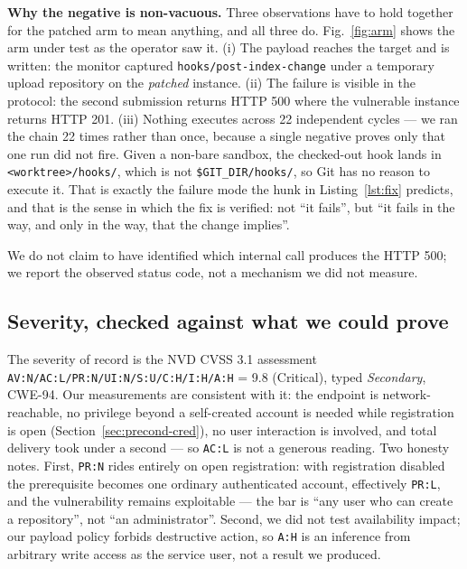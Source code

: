 \documentclass[journal]{IEEEtran}
\begin{document}
\textbf{Why the negative is non-vacuous.} Three observations have to hold
together for the patched arm to mean anything, and all three do. Fig.~\ref{fig:arm}
shows the arm under test as the operator saw it. (i) The payload
reaches the target and is written: the monitor captured
\texttt{hooks/post-index-change} under a temporary upload repository on the
\emph{patched} instance. (ii) The failure is visible in the protocol: the second
submission returns HTTP 500 where the vulnerable instance returns HTTP 201.
(iii) Nothing executes across 22 independent cycles --- we ran the chain 22 times
rather than once, because a single negative proves only that one run did not
fire. Given a non-bare sandbox, the checked-out hook lands in
\texttt{<worktree>/hooks/}, which is not \texttt{\$GIT\_DIR/hooks/}, so Git has no
reason to execute it. That is exactly the failure mode the hunk in
Listing~\ref{lst:fix} predicts, and that is the sense in which the fix is
verified: not ``it fails'', but ``it fails in the way, and only in the way, that
the change implies''.

We do not claim to have identified which internal call produces the HTTP 500; we
report the observed status code, not a mechanism we did not measure.

\subsection{Severity, checked against what we could prove}
\label{sec:cvss}

The severity of record is the NVD CVSS 3.1 assessment
\texttt{AV:N/AC:L/PR:N/UI:N/S:U/C:H/I:H/A:H} = 9.8 (Critical), typed
\emph{Secondary}, CWE-94. Our measurements are consistent with it: the endpoint
is network-reachable, no privilege beyond a self-created account is needed while
registration is open (Section~\ref{sec:precond-cred}), no user interaction is
involved, and total delivery took under a second --- so \texttt{AC:L} is not a
generous reading. Two honesty notes. First, \texttt{PR:N} rides entirely on open
registration: with registration disabled the prerequisite becomes one ordinary
authenticated account, effectively \texttt{PR:L}, and the vulnerability remains
exploitable --- the bar is ``any user who can create a repository'', not ``an
administrator''. Second, we did not test availability impact; our payload policy
forbids destructive action, so \texttt{A:H} is an inference from arbitrary write
access as the service user, not a result we produced.

\end{document}
